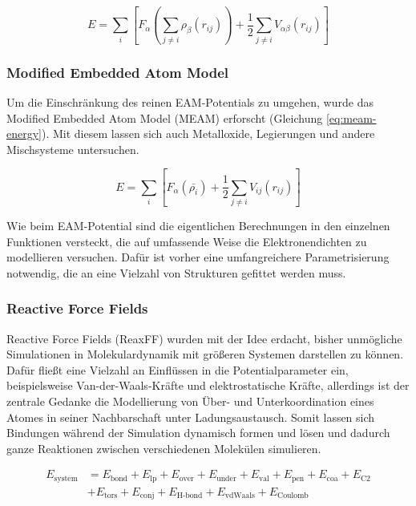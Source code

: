 \begin{equation}
  \label{eq:eam-energy}
  E = \sum_i\left[F_\alpha\left(\sum_{j\neq i}{\rho_\beta\left(r_{ij}\right)}\right) + \frac{1}{2}\sum_{j\neq i}{V_{\alpha\beta}\left(r_{ij}\right)}\right]
\end{equation}

\subsubsection{Modified Embedded Atom Model}

Um die Einschränkung des reinen EAM-Potentials zu umgehen, wurde das Modified Embedded Atom Model (MEAM) erforscht (Gleichung \ref{eq:meam-energy}). 
Mit diesem lassen sich auch Metalloxide, Legierungen und andere Mischsysteme untersuchen.


\begin{equation}
  \label{eq:meam-energy}
  E = \sum_i\left[F_\alpha\left(\bar{\rho_i}\right) + \frac{1}{2}\sum_{j\neq i}{V_{ij}\left(r_{ij}\right)}\right]
\end{equation}

Wie beim EAM-Potential sind die eigentlichen Berechnungen in den einzelnen Funktionen versteckt, die auf umfassende Weise die Elektronendichten zu modellieren versuchen.
Dafür ist vorher eine umfangreichere Parametrisierung notwendig, die an eine Vielzahl von Strukturen gefittet werden muss.

\subsubsection{Reactive Force Fields}

Reactive Force Fields (ReaxFF) wurden mit der Idee erdacht, bisher unmögliche Simulationen in Molekulardynamik mit größeren Systemen darstellen zu können.
Dafür fließt eine Vielzahl an Einflüssen in die Potentialparameter ein, beispielsweise Van-der-Waals-Kräfte und elektrostatische Kräfte, allerdings ist der zentrale Gedanke die Modellierung von Über- und Unterkoordination eines Atomes in seiner Nachbarschaft unter Ladungsaustausch.
Somit lassen sich Bindungen während der Simulation dynamisch formen und lösen und dadurch ganze Reaktionen zwischen verschiedenen Molekülen simulieren.

\begin{align}
  \label{eq:reax-formulation}
  E_\text{system} &= E_\text{bond} + E_\text{lp} + E_\text{over} + E_\text{under} + E_\text{val} + E_\text{pen} + E_\text{coa} + E_\text{C2} \\
  \nonumber  & + E_\text{tors} + E_\text{conj} + E_\text{H-bond} + E_\text{vdWaals} + E_\text{Coulomb}
\end{align}

